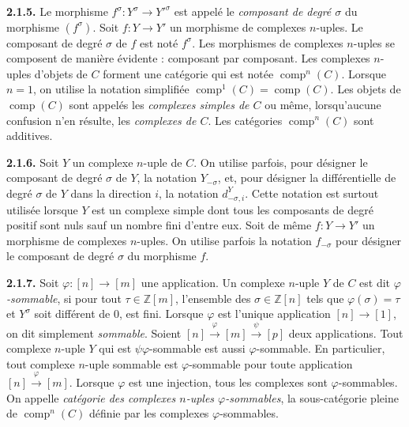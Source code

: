 %
\noindent\textbf{2.1.5.}\quad
Le morphisme $f^\sigma\colon Y^\sigma\longrightarrow Y'^\sigma$ est appelé
le \emph{composant de degré $\sigma$} du morphisme $(f^\sigma)$. Soit
$f\colon Y\longrightarrow Y'$ un morphisme de complexes $n$-uples. Le
composant de degré $\sigma$ de $f$ est noté $f^\sigma$.
Les morphismes de complexes $n$-uples se composent de manière évidente :
composant par composant.
Les complexes $n$-uples d'objets de $C$ forment une catégorie qui est notée
$\operatorname{comp}^{n}(C)$. Lorsque $n=1$, on utilise la notation simplifiée
$\operatorname{comp}^{1}(C)=\operatorname{comp}(C)$. Les objets de
$\operatorname{comp}(C)$ sont appelés les \emph{complexes simples de $C$} ou
même, lorsqu'aucune confusion n'en résulte, les \emph{complexes de $C$}. Les
catégories $\operatorname{comp}^{n}(C)$ sont additives.

\noindent\textbf{2.1.6.}\quad
Soit $Y$ un complexe $n$-uple de $C$. On utilise parfois, pour désigner le
composant de degré $\sigma$ de $Y$, la notation $Y_{-\sigma}$, et, pour
désigner la différentielle de degré $\sigma$ de $Y$ dans la direction $i$,
la notation $d^Y_{-\sigma,i}$.
Cette notation est surtout utilisée lorsque $Y$ est un complexe simple dont
tous les composants de degré positif sont nuls sauf un nombre fini d'entre
eux. Soit de même $f\colon Y\longrightarrow Y'$ un morphisme de complexes
$n$-uples. On utilise parfois la notation $f_{-\sigma}$ pour désigner le
composant de degré $\sigma$ du morphisme $f$.

\noindent\textbf{2.1.7.}\quad
Soit $\varphi\colon[n]\longrightarrow[m]$ une application.
Un complexe $n$-uple $Y$ de $C$ est dit \emph{$\varphi$-sommable}, si pour
tout $\tau\in\mathbb Z[m]$, l'ensemble des $\sigma\in\mathbb Z[n]$ tels que
$\varphi(\sigma)=\tau$ et $Y^\sigma$ soit différent de $0$, est fini. Lorsque
$\varphi$ est l'unique application $[n]\longrightarrow[1]$, on dit simplement
\emph{sommable}.
Soient $[n]\xrightarrow{\varphi}[m]\xrightarrow{\psi}[p]$ deux applications.
Tout complexe $n$-uple $Y$ qui est $\psi\varphi$-sommable est aussi
$\varphi$-sommable. En particulier, tout complexe $n$-uple sommable est
$\varphi$-sommable pour toute application
$[n]\xrightarrow{\varphi}[m]$.
Lorsque $\varphi$ est une injection, tous les complexes sont
$\varphi$-sommables.
On appelle \emph{catégorie des complexes $n$-uples $\varphi$-sommables}, la
sous-catégorie pleine de $\operatorname{comp}^{n}(C)$ définie par les
complexes $\varphi$-sommables.

